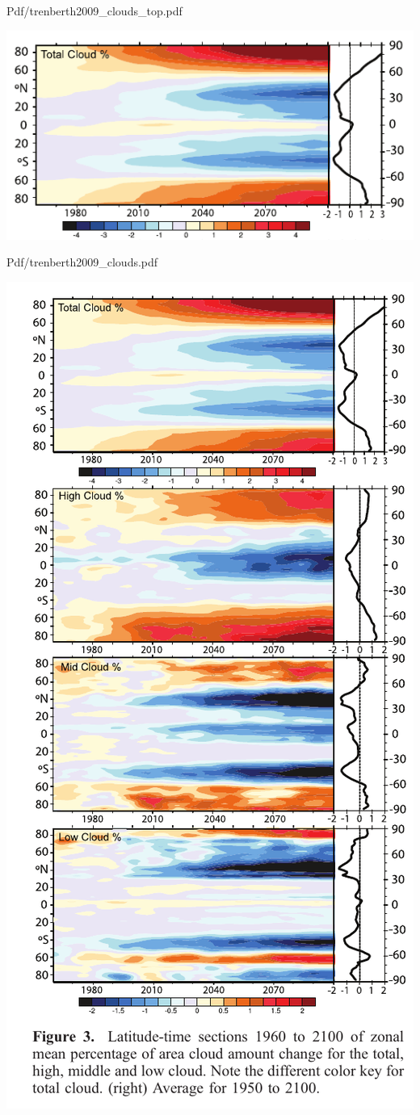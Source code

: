 \documentclass[10pt,t]{beamer}
\begin{document}
\begin{frame}[label={sec:orgd04b00e}]{Pdf/trenberth2009\_clouds\_top.pdf}
\begin{center}
\includegraphics[width=0.7\linewidth]{./Figs/Pdf/trenberth2009_clouds_top.pdf}
\end{center}
\end{frame}

\begin{frame}[label={sec:orgaf52848}]{Pdf/trenberth2009\_clouds.pdf}
\begin{center}
\includegraphics[width=0.7\linewidth]{./Figs/Pdf/trenberth2009_clouds.pdf}
\end{center}
\end{frame}
\end{document}
